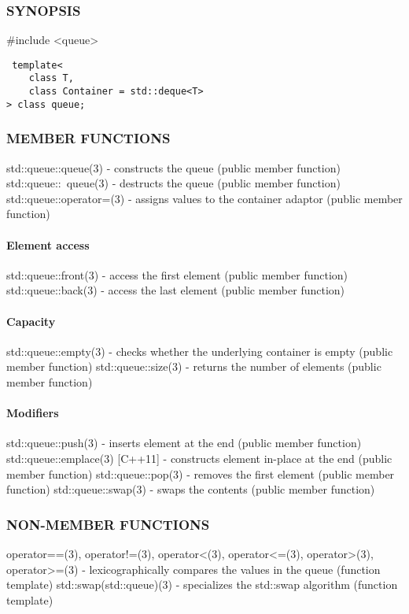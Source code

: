 \subsubsection{SYNOPSIS}
\#include <queue>

\begin{lstlisting}
 template<
    class T,
    class Container = std::deque<T>
> class queue;
\end{lstlisting}

\subsubsection{MEMBER FUNCTIONS}
std::queue::queue(3) - constructs the queue  (public member function)
std::queue::~queue(3) - destructs the queue  (public member function)
std::queue::operator=(3) - assigns values to the container adaptor  (public member function)
\paragraph{Element access}
std::queue::front(3) - access the first element   (public member function)
std::queue::back(3) - access the last element   (public member function)
\paragraph{Capacity}
std::queue::empty(3) - checks whether the underlying container is empty   (public member function)
std::queue::size(3) - returns the number of elements   (public member function)
\paragraph{Modifiers}
std::queue::push(3) - inserts element at the end  (public member function)
std::queue::emplace(3) [C++11] - constructs element in-place at the end   (public member function)
std::queue::pop(3) - removes the first element   (public member function)
std::queue::swap(3) - swaps the contents   (public member function)

\subsubsection{NON-MEMBER FUNCTIONS}
operator==(3), operator!=(3), operator<(3), operator<=(3), operator>(3), operator>=(3) - lexicographically compares the values in the queue   (function template)
std::swap(std::queue)(3) - specializes the std::swap algorithm   (function template)



